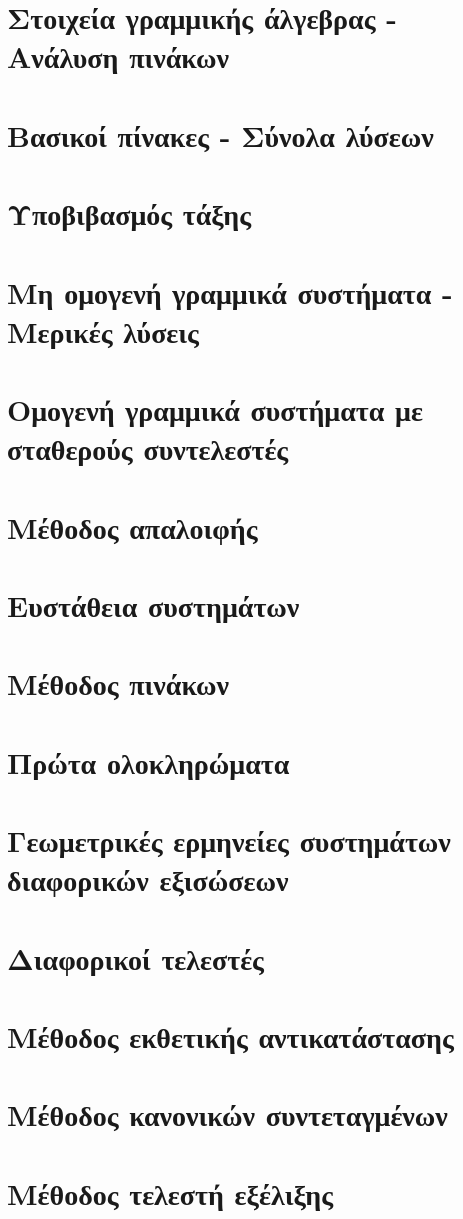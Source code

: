 \documentclass[11pt,a4paper,twoside]{book}
\begin{document}
\section{Στοιχεία γραμμικής άλγεβρας - Ανάλυση πινάκων}
\section{Βασικοί πίνακες - Σύνολα λύσεων}
\section{Υποβιβασμός τάξης}
\section{Μη ομογενή γραμμικά συστήματα - Μερικές λύσεις}
\section{Ομογενή γραμμικά συστήματα με σταθερούς συντελεστές}
\section{Μέθοδος απαλοιφής}
\section{Ευστάθεια συστημάτων}
\section{Μέθοδος πινάκων}
\section{Πρώτα ολοκληρώματα}
\section{Γεωμετρικές ερμηνείες συστημάτων διαφορικών εξισώσεων}
\section{Διαφορικοί τελεστές}
\section{Μέθοδος εκθετικής αντικατάστασης}
\section{Μέθοδος κανονικών συντεταγμένων}
\section{Μέθοδος τελεστή εξέλιξης}
\end{document}
